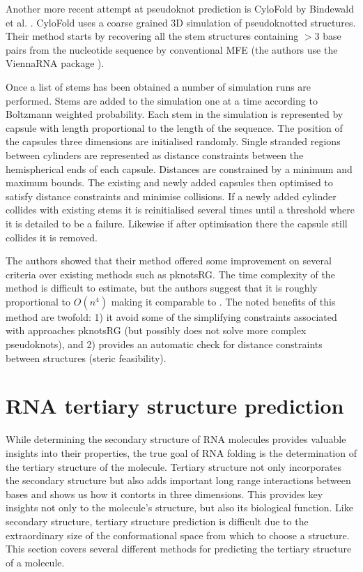 \documentclass[journal]{IEEEtran}
\begin{document}
Another more recent attempt at pseudoknot prediction is CyloFold by Bindewald et al. \cite{bindewald2010cylofold}. CyloFold uses a coarse grained 3D simulation of pseudoknotted structures. Their method starts by recovering all the stem structures containing $>3$ base pairs from the nucleotide sequence by conventional MFE (the authors use the ViennaRNA package \cite{lorenz2011viennarna}). 

Once a list of stems has been obtained a number of simulation runs are performed. Stems are added to the simulation one at a time according to Boltzmann weighted probability. Each stem in the simulation is represented by capsule with length proportional to the length of the sequence. The position of the capsules three dimensions are initialised randomly. Single stranded regions between cylinders are represented as distance constraints between the hemispherical ends of each capsule. Distances are constrained by a minimum and maximum bounds. The existing and newly added capsules then optimised to satisfy distance constraints and minimise collisions. If a newly added cylinder collides with existing stems it is reinitialised several times until a threshold where it is detailed to be a failure. Likewise if after optimisation there the capsule still collides it is removed.

The authors showed that their method offered some improvement on several criteria over existing methods such as pknotsRG. The time complexity of the method is difficult to estimate, but the authors suggest that it is roughly proportional to $O(n^4)$ making it comparable to \cite{reeder2007pknotsrg}. The noted benefits of this method are twofold: 1) it avoid some of the simplifying constraints associated with approaches pknotsRG (but possibly does not solve more complex pseudoknots), and 2) provides an automatic check for distance constraints between structures (steric feasibility).



\section{RNA tertiary structure prediction}
\label{sec:rna-tertiary-structure}
While determining the secondary structure of RNA molecules provides valuable insights into their properties, the true goal of RNA folding is the determination of the tertiary structure of the molecule. Tertiary structure not only incorporates the secondary structure but also adds important long range interactions between bases and shows us how it contorts in three dimensions. This provides key insights not only to the molecule's structure, but also its biological function. Like secondary structure, tertiary structure prediction is difficult due to the extraordinary size of the conformational space from which to choose a structure. This section covers several different methods for predicting the tertiary structure of a molecule.
\end{document}
